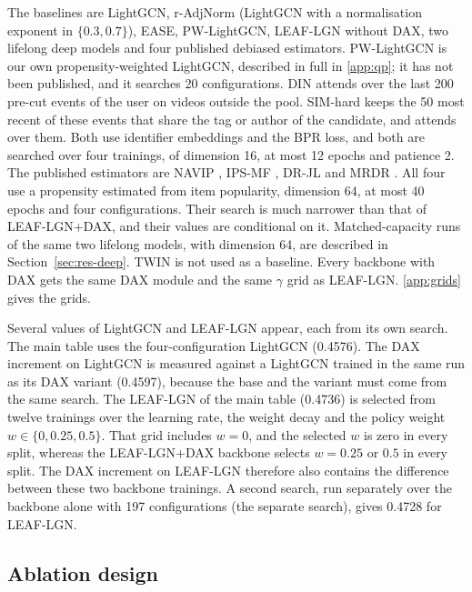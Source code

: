 \documentclass[preprint,12pt,authoryear]{elsarticle}
\begin{document}
The baselines are LightGCN, r-AdjNorm (LightGCN with a normalisation exponent in $\{0.3,0.7\}$), EASE, PW-LightGCN, LEAF-LGN without DAX, two
lifelong deep models and four published debiased estimators. PW-LightGCN is our own propensity-weighted LightGCN, described in full in
\ref{app:qp}; it has not been published, and it searches 20 configurations. DIN \citep{zhou2018din} attends over the last 200 pre-cut
events of the user on videos outside the pool. SIM-hard \citep{pi2020sim} keeps the 50 most recent of these events that share the tag or author
of the candidate, and attends over them. Both use identifier embeddings and the BPR loss, and both are searched over four trainings, of dimension
16, at most 12 epochs and patience 2. The published estimators are NAVIP \citep{kim2022navip}, IPS-MF \citep{schnabel2016}, DR-JL \citep{wang2019drjl}
and MRDR \citep{guo2021mrdr}. All four use a propensity estimated from item popularity, dimension 64, at most 40 epochs and four configurations.
Their search is much narrower than that of LEAF-LGN+DAX, and their values are conditional on it. Matched-capacity runs of the same two
lifelong models, with dimension 64, are described in Section~\ref{sec:res-deep}. TWIN \citep{chang2023twin} is not used as a
baseline. Every backbone with DAX gets the same DAX module and the same $\gamma$ grid as LEAF-LGN. \ref{app:grids} gives the grids.

Several values of LightGCN and LEAF-LGN appear, each from its own search. The main table uses the four-configuration LightGCN (0.4576). The DAX increment on
LightGCN is measured against a LightGCN trained in the same run as its DAX variant (0.4597), because the base and the variant must come from the
same search. The LEAF-LGN of the main table (0.4736) is selected from twelve trainings over the learning rate, the weight decay and the policy
weight $w\in\{0,0.25,0.5\}$. That grid includes $w=0$, and the selected $w$ is zero in every split, whereas the LEAF-LGN+DAX backbone selects
$w=0.25$ or $0.5$ in every split. The DAX increment on LEAF-LGN therefore also contains the difference between these two backbone trainings. A
second search, run separately over the backbone alone with 197 configurations (the separate search), gives 0.4728 for LEAF-LGN.

\subsection{Ablation design}
\label{sec:protocol-ablation}
\end{document}
